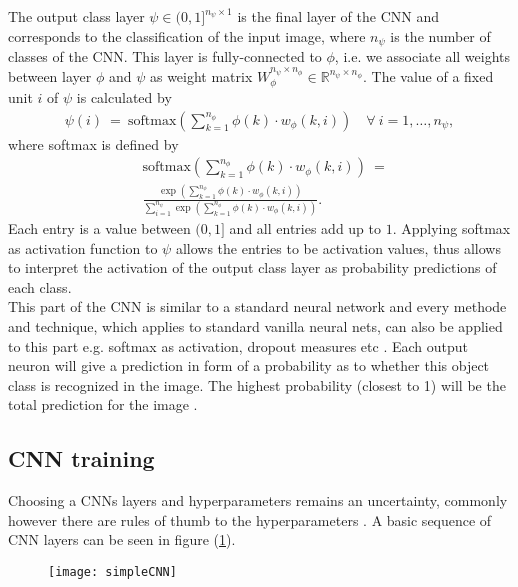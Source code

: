 \documentclass{article}
\begin{document}
The output class layer $\psi \in (0,1]^{n_\psi \times 1}$ is the final layer of the CNN and corresponds to the classification of the input image, where $n_\psi$ is the number of classes of the CNN. This layer is fully-connected to $\phi$, i.e. we associate all weights between layer $\phi$ and $\psi$ as weight matrix $W_\phi^{n_\psi \times n_\phi} \in \mathbb{R}^{n_\psi \times n_\phi}$. The value of a fixed unit $i$ of $\psi$ is calculated by
\begin{align}
\psi(i) \ = \ \text{softmax} \left( \sum_{k=1}^{n_\phi} \phi(k) \cdot w_\phi (k,i) \right) \quad \forall \ i=1, \ldots, n_\psi,
\end{align}
where softmax \cite{wiki_softmax} is defined by
\begin{align}
&\text{softmax} \left( \sum_{k=1}^{n_\phi} \phi(k) \cdot w_\phi (k,i) \right) \ = \\
&\frac{\exp \left( \sum_{k=1}^{n_\phi} \phi(k) \cdot w_\phi (k,i) \right)}{\sum_{i=1}^{n_\psi} \exp \left( \sum_{k=1}^{n_\phi} \phi(k) \cdot w_\phi (k,i) \right)}. \label{softmax}
\end{align}
Each entry is a value between $(0,1]$ and all entries add up to $1$. Applying softmax as activation function to $\psi$ allows the entries to be activation values, thus allows to interpret the activation of the output class layer as probability predictions of each class.\\
This part of the CNN is similar to a standard neural network and every methode and technique, which applies to standard vanilla neural nets, can also be applied to this part e.g. softmax as activation, dropout measures etc \cite{cs231:optimizers}. Each output neuron will give a prediction in form of a probability as to whether this object class is recognized in the image. The highest probability (closest to 1) will be the total prediction for the image \cite{wiki_convnets}.\\

\subsection{CNN training}

Choosing a CNNs layers and hyperparameters remains an uncertainty, commonly however there are rules of thumb to the hyperparameters \cite{cs231:optimizers}. A basic sequence of CNN layers can be seen in figure (\ref{basic_CNN_structure}).

\begin{figure}[!htb]
\vskip 0.2in
\begin{center}
\centerline{\texttt{[image: simpleCNN]}}
\caption{\cite{sequence}}\label{basic_CNN_structure}
\end{center}
\vskip -0.2in
\end{figure}
\end{document}
